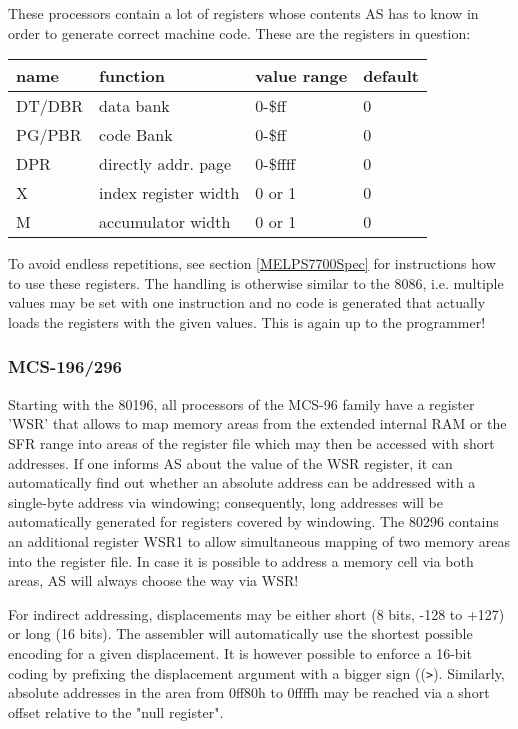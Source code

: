 \documentclass[12pt,twoside]{report}
\begin{document}
These processors contain a lot of registers whose contents AS has to know
in order to generate correct machine code.  These are the registers
in question:
\begin{center}\begin{tabular}{|l|l|l|l|}
\hline
name   & function             & value range   & default \\
\hline
\hline
DT/DBR & data bank            & 0-\$ff        &  0 \\
PG/PBR & code Bank            & 0-\$ff        &  0 \\
DPR    & directly addr. page  & 0-\$ffff      &  0 \\
X      & index register width & 0 or 1        &  0 \\
M      & accumulator width    & 0 or 1        &  0 \\
\hline
\end{tabular}\end{center}
\par
To avoid endless repetitions, see section \ref{MELPS7700Spec} for
instructions how to use these registers.  The handling is otherwise
similar to the 8086, i.e. multiple values may be set with one instruction
and no code is generated that actually loads the registers with the given
values.  This is again up to the programmer!


\subsubsection{MCS-196/296}

Starting with the 80196, all processors of the MCS-96 family have a
register 'WSR' that allows to map memory areas from the extended
internal RAM or the SFR range into areas of the register file which
may then be accessed with short addresses.  If one informs AS about
the value of the WSR register, it can automatically find out whether
an absolute address can be addressed with a single-byte address via
windowing; consequently, long addresses will be automatically generated
for registers covered by windowing.  The 80296 contains an additional
register WSR1 to allow simultaneous mapping of two memory areas into
the register file.  In case it is possible to address a memory cell
via both areas, AS will always choose the way via WSR!

For indirect addressing, displacements may be either short (8 bits,
-128 to +127) or long (16 bits).  The assembler will automatically
use the shortest possible encoding for a given displacement.  It
is however possible to enforce a 16-bit coding by prefixing the
displacement argument with a bigger sign ((\verb!>!).  Similarly,
absolute addresses in the area from 0ff80h to 0ffffh may be reached
via a short offset relative to the "null register".
\end{document}
